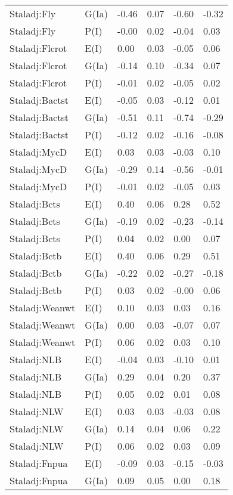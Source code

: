 \begin{center}
\begin{longtable}{|p{1.1in}|p{0.7in}|p{0.7in}|p{0.6in}|p{0.6in}|p{0.6in}|}
  Staladj:Fly & G(Ia) & -0.46 & 0.07 & -0.60 & -0.32 \\ 
  Staladj:Fly & P(I) & -0.00 & 0.02 & -0.04 & 0.03 \\ 
  Staladj:Flcrot & E(I) & 0.00 & 0.03 & -0.05 & 0.06 \\ 
  Staladj:Flcrot & G(Ia) & -0.14 & 0.10 & -0.34 & 0.07 \\ 
  Staladj:Flcrot & P(I) & -0.01 & 0.02 & -0.05 & 0.02 \\ 
  Staladj:Bactst & E(I) & -0.05 & 0.03 & -0.12 & 0.01 \\ 
  Staladj:Bactst & G(Ia) & -0.51 & 0.11 & -0.74 & -0.29 \\ 
  Staladj:Bactst & P(I) & -0.12 & 0.02 & -0.16 & -0.08 \\ 
  Staladj:MycD & E(I) & 0.03 & 0.03 & -0.03 & 0.10 \\ 
  Staladj:MycD & G(Ia) & -0.29 & 0.14 & -0.56 & -0.01 \\ 
  Staladj:MycD & P(I) & -0.01 & 0.02 & -0.05 & 0.03 \\ 
  Staladj:Bcts & E(I) & 0.40 & 0.06 & 0.28 & 0.52 \\ 
  Staladj:Bcts & G(Ia) & -0.19 & 0.02 & -0.23 & -0.14 \\ 
  Staladj:Bcts & P(I) & 0.04 & 0.02 & 0.00 & 0.07 \\ 
  Staladj:Bctb & E(I) & 0.40 & 0.06 & 0.29 & 0.51 \\ 
  Staladj:Bctb & G(Ia) & -0.22 & 0.02 & -0.27 & -0.18 \\ 
  Staladj:Bctb & P(I) & 0.03 & 0.02 & -0.00 & 0.06 \\ 
  Staladj:Weanwt & E(I) & 0.10 & 0.03 & 0.03 & 0.16 \\ 
  Staladj:Weanwt & G(Ia) & 0.00 & 0.03 & -0.07 & 0.07 \\ 
  Staladj:Weanwt & P(I) & 0.06 & 0.02 & 0.03 & 0.10 \\ 
  Staladj:NLB & E(I) & -0.04 & 0.03 & -0.10 & 0.01 \\ 
  Staladj:NLB & G(Ia) & 0.29 & 0.04 & 0.20 & 0.37 \\ 
  Staladj:NLB & P(I) & 0.05 & 0.02 & 0.01 & 0.08 \\ 
  Staladj:NLW & E(I) & 0.03 & 0.03 & -0.03 & 0.08 \\ 
  Staladj:NLW & G(Ia) & 0.14 & 0.04 & 0.06 & 0.22 \\ 
  Staladj:NLW & P(I) & 0.06 & 0.02 & 0.03 & 0.09 \\ 
  Staladj:Fnpua & E(I) & -0.09 & 0.03 & -0.15 & -0.03 \\ 
  Staladj:Fnpua & G(Ia) & 0.09 & 0.05 & 0.00 & 0.18 \\ 

\end{longtable}
\end{center}
